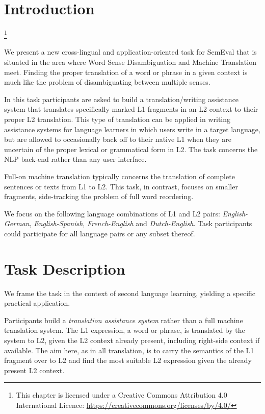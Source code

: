 \newcommand\blfootnote[1]{%
\begingroup
\renewcommand\thefootnote{}\footnote{#1}%
\addtocounter{footnote}{-1}%
\endgroup
}

\section{Introduction} %

\blfootnote{This chapter is licensed under a Creative Commons Attribution 4.0 International Licence: \url{https://creativecommons.org/licenses/by/4.0/}}

We present a new cross-lingual and application-oriented task for SemEval that
is situated in the area where Word Sense Disambiguation and Machine Translation
meet. Finding the proper translation of a word or phrase in a given context is
much like the problem of disambiguating between multiple senses.

In this task participants are asked to build a translation/writing assistance
system that translates specifically marked L1 fragments in an L2 context to
their proper L2 translation. This type of translation can be applied in writing
assistance systems for language learners in which users write in a target
language, but are allowed to occasionally back off to their native L1 when they
are uncertain of the proper lexical or grammatical form in L2. The task
concerns the NLP back-end rather than any user interface.

Full-on machine translation typically concerns the translation of complete
sentences or texts from L1 to L2. This task, in contrast, focuses on smaller
fragments, side-tracking the problem of full word reordering.


We focus on the following language combinations of L1 and L2 pairs:
\emph{English-German}, \emph{English-Spanish}, \emph{French-English} and
\emph{Dutch-English}. Task participants could participate for all language
pairs or any subset thereof.


\section{Task Description}

We frame the task in the context of second language learning, yielding a
specific practical application.

Participants build a \emph{translation assistance system}\/ rather than a full
machine translation system. The L1 expression, a word or phrase, is translated
by the system to L2, given the L2 context already present, including right-side
context if available. The aim here, as in all translation, is to carry the
semantics of the L1 fragment over to L2 and find the most suitable L2
expression given the already present L2 context.

